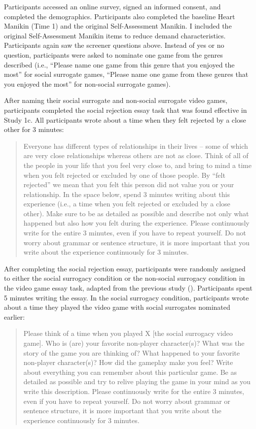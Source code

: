 \documentclass[
]{udthesis}
\begin{document}
Participants accessed an online survey, signed an informed consent, and completed the demographics. Participants also completed the baseline Heart Manikin (Time 1) and the original Self-Assessment Manikin. I included the original Self-Assessment Manikin items to reduce demand characteristics. Participants again saw the screener questions above. Instead of yes or no question, participants were asked to nominate one game from the genres described (i.e., ``Please name one game from this genre that you enjoyed the most'' for social surrogate games, ``Please name one game from these genres that you enjoyed the most'' for non-social surrogate games).

After naming their social surrogate and non-social surrogate video games, participants completed the social rejection essay task that was found effective in Study 1c. All participants wrote about a time when they felt rejected by a close other for 3 minutes:

\begin{quote}
Everyone has different types of relationships in their lives -- some of which are very close relationships whereas others are not as close. Think of all of the people in your life that you feel very close to, and bring to mind a time when you felt rejected or excluded by one of those people. By ``felt rejected'' we mean that you felt this person did not value you or your relationship. In the space below, spend 3 minutes writing about this experience (i.e., a time when you felt rejected or excluded by a close other). Make sure to be as detailed as possible and describe not only what happened but also how you felt during the experience. Please continuously write for the entire 3 minutes, even if you have to repeat yourself. Do not worry about grammar or sentence structure, it is more important that you write about the experience continuously for 3 minutes.
\end{quote}

After completing the social rejection essay, participants were randomly assigned to either the social surrogacy condition or the non-social surrogacy condition in the video game essay task, adapted from the previous study (). Participants spent 5 minutes writing the essay. In the social surrogacy condition, participants wrote about a time they played the video game with social surrogates nominated earlier:

\begin{quote}
Please think of a time when you played X {[}the social surrogacy video game{]}. Who is (are) your favorite non-player character(s)? What was the story of the game you are thinking of? What happened to your favorite non-player character(s)? How did the gameplay make you feel? Write about everything you can remember about this particular game. Be as detailed as possible and try to relive playing the game in your mind as you write this description. Please continuously write for the entire 3 minutes, even if you have to repeat yourself. Do not worry about grammar or sentence structure, it is more important that you write about the experience continuously for 3 minutes.
\end{quote}
\end{document}
